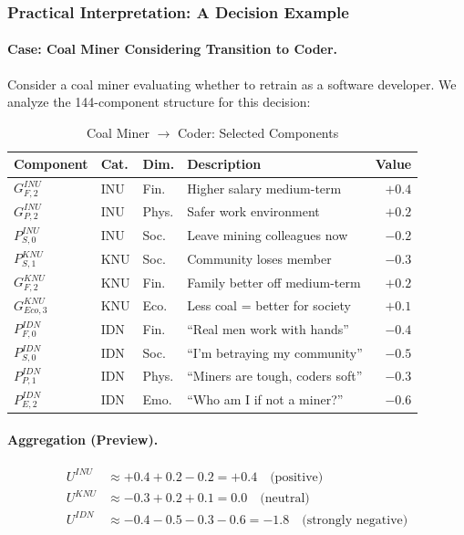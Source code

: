 \subsubsection{Practical Interpretation: A Decision Example}

\paragraph{Case: Coal Miner Considering Transition to Coder.}

Consider a coal miner evaluating whether to retrain as a software developer.
We analyze the 144-component structure for this decision:

\begin{table}[htbp]
\centering
\caption{Coal Miner $\rightarrow$ Coder: Selected Components}
\label{tab:coal-miner-example}
\small
\renewcommand{\arraystretch}{1.2}
\begin{tabular}{@{}llllr@{}}
\toprule
\textbf{Component} & \textbf{Cat.} & \textbf{Dim.} & \textbf{Description} & \textbf{Value} \\
\midrule
$G^{INU}_{F,2}$ & INU & Fin. & Higher salary medium-term & $+0.4$ \\
$G^{INU}_{P,2}$ & INU & Phys. & Safer work environment & $+0.2$ \\
$P^{INU}_{S,0}$ & INU & Soc. & Leave mining colleagues now & $-0.2$ \\
\midrule
$P^{KNU}_{S,1}$ & KNU & Soc. & Community loses member & $-0.3$ \\
$G^{KNU}_{F,2}$ & KNU & Fin. & Family better off medium-term & $+0.2$ \\
$G^{KNU}_{Eco,3}$ & KNU & Eco. & Less coal = better for society & $+0.1$ \\
\midrule
$P^{IDN}_{F,0}$ & IDN & Fin. & ``Real men work with hands'' & $-0.4$ \\
$P^{IDN}_{S,0}$ & IDN & Soc. & ``I'm betraying my community'' & $-0.5$ \\
$P^{IDN}_{P,1}$ & IDN & Phys. & ``Miners are tough, coders soft'' & $-0.3$ \\
$P^{IDN}_{E,2}$ & IDN & Emo. & ``Who am I if not a miner?'' & $-0.6$ \\
\bottomrule
\end{tabular}
\end{table}

\paragraph{Aggregation (Preview).}
\begin{align*}
U^{INU} &\approx +0.4 + 0.2 - 0.2 = +0.4 \quad \text{(positive)} \\
U^{KNU} &\approx -0.3 + 0.2 + 0.1 = 0.0 \quad \text{(neutral)} \\
U^{IDN} &\approx -0.4 - 0.5 - 0.3 - 0.6 = -1.8 \quad \text{(strongly negative)}
\end{align*}

